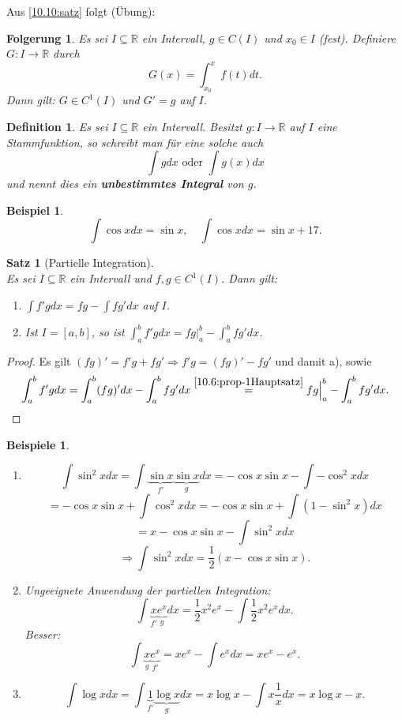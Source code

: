 \documentclass[12pt]{extreport} %
\newcommand{\R}{\mathbb{R}}
\theoremstyle{named}
\theoremstyle{itshape}
\newtheorem{satz}[unnamedtheorem]{Satz}
\newtheorem*{definition}{Definition}
\theoremstyle{normal}
\newtheorem{beispiel}[unnamedtheorem]{Beispiel}
\newtheorem{folgerung}[unnamedtheorem]{Folgerung}
\newtheorem*{beispiele}{Beispiele}
\begin{document}
{Aus \ref{10.10:satz} folgt (Übung):

\begin{folgerung} \label{10.12:folg}
	Es sei $I \subseteq \R$ ein Intervall, $g \in C(I)$ und $x_0 \in I$ (fest). Definiere $G \colon I \rightarrow \R$ durch
	$$ G(x) = \int_{x_0}^{x} f(t) dt. $$
	Dann gilt: $G \in C^{1}(I)$ und $G' = g$ auf $I$.
\end{folgerung}

\begin{definition}
	Es sei $I \subseteq \R$ ein Intervall. Besitzt $g \colon I \rightarrow \R$ auf $I$ eine Stammfunktion, so schreibt man für eine solche auch 
	$$\int g dx \text{  oder  } \int g(x) dx $$
	und nennt dies ein \textbf{unbestimmtes Integral} von $g$.
\end{definition}

\begin{beispiel} 
	$$\int \cos x dx = \sin x,  \quad  \int \cos x dx = \sin x  + 17.$$
\end{beispiel}

\begin{satz}[Partielle Integration] ~\\
	Es sei $I \subseteq \R$ ein Intervall und $f, g \in C^{1}(I)$. Dann gilt:
	\begin{enumerate}
		\item $\int f' g dx = f g - \int f g' dx$ auf $I$.
		\item Ist $I = [a, b]$, so ist $\int_{a}^{b} f' g dx = f g \Big|_{a}^{b} - \int_{a}^{b} f g' dx$.
	\end{enumerate}
\end{satz}

\begin{proof}
	Es gilt $(f g)' = f' g + f g' \Rightarrow f' g = (fg)' - fg'$ und damit a), sowie
		$$ \int_{a}^{b} f' g dx = \int_{a}^{b} (fg)' dx - \int_{a}^{b} fg' dx \overset{\ref{10.6:prop-1Hauptsatz}}{=} fg \Big|_{a}^{b} - \int_{a}^{b} fg' dx. $$ 
\end{proof}


\begin{beispiele} ~\
	\begin{enumerate}
		\item $$\int \sin^{2} x dx = \int \underbrace{\sin x}_{ f' } \underbrace{\sin x}_{ g } dx = - \cos x \sin x - \int - \cos^{2} x dx$$
			$$ = - \cos x \sin x + \int \cos^{2} x dx  = - \cos x \sin x + \int (1 - \sin^{2} x) dx$$
			$$= x - \cos x \sin x - \int \sin^{2} x dx $$
			$$\Rightarrow \int \sin^{2} x dx = \frac{1}{2} (x - \cos x \sin x).$$
		\item Ungeeignete Anwendung der partiellen Integration:
		$$\int \underbrace{x}_{f'} \underbrace{e^{x}}_{g} dx = \frac{1}{2} x^{2} e^{x} - \int \frac{1}{2} x^{2} e^{x} dx.$$ 
		Besser:
		$$\int \underbrace{x}_{g} \underbrace{e^{x}}_{f'} = x e^{x} - \int e^{x} dx = x e^{x}- e^{x}.$$
		\item $$\int \log x dx = \int \underbrace{1}_{f'} \underbrace{\log x}_{g} dx = x \log x - \int x \frac{1}{x} dx = x \log x - x.$$
	\end{enumerate}	
\end{beispiele}


}
\end{document}
